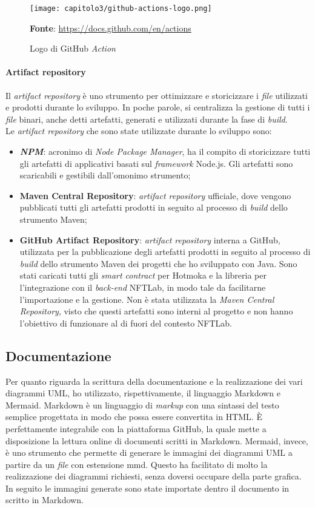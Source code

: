 \begin{figure}[h!]
  \centering
  \texttt{[image: capitolo3/github-actions-logo.png]}
  \caption{Logo di GitHub \textit{Action}}
  \textbf{Fonte}: \href{https://docs.github.com/en/actions}{https://docs.github.com/en/actions}
\end{figure}

\paragraph{Artifact repository}
Il \textit{artifact repository} è uno strumento per ottimizzare e storicizzare i \textit{file} utilizzati e prodotti durante lo sviluppo. In poche parole, si centralizza la gestione di tutti i \textit{file} binari, anche detti artefatti, generati e utilizzati durante la fase di \textit{build}. \\

Le \textit{artifact repository} che sono state utilizzate durante lo sviluppo sono:
\begin{itemize}
  \item \textbf{\textit{NPM}}: acronimo di \textit{Node Package Manager}, ha il compito di storicizzare tutti gli artefatti di applicativi basati sul \textit{framework} Node.js. Gli artefatti sono scaricabili e gestibili dall'omonimo strumento;
  \item \textbf{Maven Central Repository}: \textit{artifact repository} ufficiale, dove vengono pubblicati tutti gli artefatti prodotti in seguito al processo di \textit{build} dello strumento Maven;
  \item \textbf{GitHub Artifact Repository}: \textit{artifact repository} interna a GitHub, utilizzata per la pubblicazione degli artefatti prodotti in seguito al processo di \textit{build} dello strumento Maven dei progetti che ho sviluppato con Java. Sono stati caricati tutti gli \textit{smart contract} per Hotmoka e la libreria per l'integrazione con il \textit{back-end} NFTLab, in modo tale da facilitarne l'importazione e la gestione. Non è stata utilizzata la \textit{Maven Central Repository}, visto che questi artefatti sono interni al progetto e non hanno l'obiettivo di funzionare al di fuori del contesto NFTLab.
\end{itemize}

\subsection{Documentazione}
Per quanto riguarda la scrittura della documentazione e la realizzazione dei vari diagrammi UML, ho utilizzato, rispettivamente, il linguaggio Markdown e Mermaid. Markdown è un linguaggio di \textit{markup} con una sintassi del testo semplice progettata in modo che possa essere convertita in HTML. È perfettamente integrabile con la piattaforma GitHub, la quale mette a disposizione la lettura online di documenti scritti in Markdown.
Mermaid, invece, è uno strumento che permette di generare le immagini dei diagrammi UML a partire da un \textit{file} con estensione mmd. Questo ha facilitato di molto la realizzazione dei diagrammi richiesti, senza doversi occupare della parte grafica. In seguito le immagini generate sono state importate dentro il documento in scritto in Markdown.


